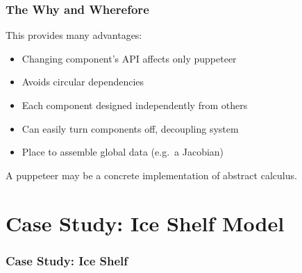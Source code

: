 \documentclass[12pt]{beamer}
\begin{document}
\begin{frame}
  \frametitle{The Why and Wherefore}
  This provides many advantages:
  \begin{itemize}
  \item Changing component's API affects only  puppeteer 
  \item Avoids circular dependencies
  \item Each component designed independently from others
  \item Can easily turn components off, decoupling system
  \item Place to assemble global data (e.g.\ a Jacobian)
  \end{itemize}

  \vspace{3mm}
  A puppeteer may be a concrete implementation of abstract calculus.
\end{frame}


\section{Case Study: Ice Shelf Model}

\begin{frame}
  \frametitle{Case Study: Ice Shelf}
  \begin{center}
    \setlength{\fboxsep}{0pt}
    \setlength{\fboxrule}{0.5pt}
  \end{center}
\end{frame}
\end{document}
